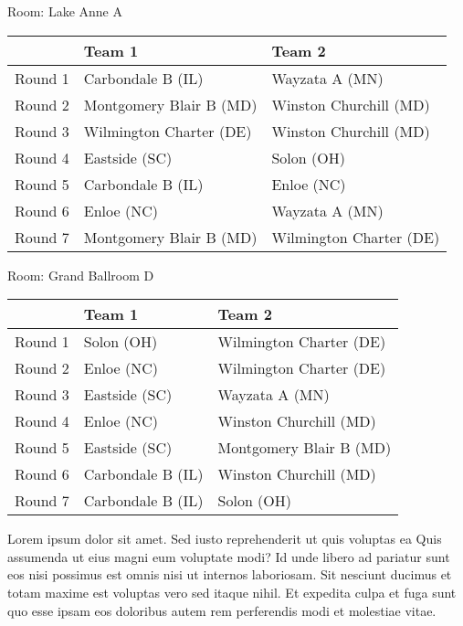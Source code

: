 \documentclass{article}%
\begin{document}
\vspace*{8pt}%
\linebreak%
\begin{flushleft}%
\begin{Large}%
Room: Lake Anne A%
\end{Large}%
\end{flushleft}%
\begin{tabularx}{\textwidth}{|c|Y|Y|}%
\hline%
&Team 1&Team 2\\%
\hline%
Round 1&Carbondale B (IL)&Wayzata A (MN)\\%
Round 2&Montgomery Blair B (MD)&Winston Churchill (MD)\\%
Round 3&Wilmington Charter (DE)&Winston Churchill (MD)\\%
Round 4&Eastside (SC)&Solon (OH)\\%
Round 5&Carbondale B (IL)&Enloe (NC)\\%
Round 6&Enloe (NC)&Wayzata A (MN)\\%
Round 7&Montgomery Blair B (MD)&Wilmington Charter (DE)\\%
\hline%
\end{tabularx}%
\vspace*{8pt}%
\linebreak%
\begin{flushleft}%
\begin{Large}%
Room: Grand Ballroom D%
\end{Large}%
\end{flushleft}%
\begin{tabularx}{\textwidth}{|c|Y|Y|}%
\hline%
&Team 1&Team 2\\%
\hline%
Round 1&Solon (OH)&Wilmington Charter (DE)\\%
Round 2&Enloe (NC)&Wilmington Charter (DE)\\%
Round 3&Eastside (SC)&Wayzata A (MN)\\%
Round 4&Enloe (NC)&Winston Churchill (MD)\\%
Round 5&Eastside (SC)&Montgomery Blair B (MD)\\%
Round 6&Carbondale B (IL)&Winston Churchill (MD)\\%
Round 7&Carbondale B (IL)&Solon (OH)\\%
\hline%
\end{tabularx}%
\vspace*{8pt}%
\linebreak%
\newline%
Lorem ipsum dolor sit amet. Sed iusto reprehenderit ut quis voluptas ea Quis assumenda ut eius magni eum voluptate modi? Id unde libero ad pariatur sunt eos nisi possimus est omnis nisi ut internos laboriosam. Sit nesciunt ducimus et totam maxime est voluptas vero sed itaque nihil. Et expedita culpa et fuga sunt quo esse ipsam eos doloribus autem rem perferendis modi et molestiae vitae.\newline%
\end{document}

